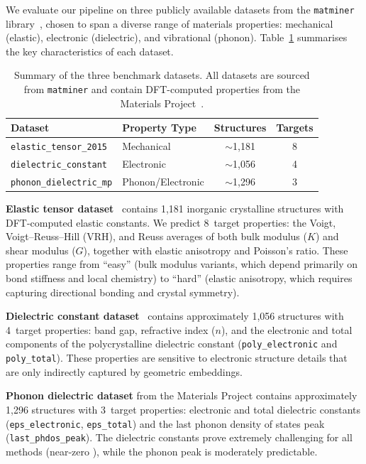 We evaluate our pipeline on three publicly available datasets from the \texttt{matminer} library~\cite{ward2018matminer}, chosen to span a diverse range of materials properties: mechanical (elastic), electronic (dielectric), and vibrational (phonon).
Table~\ref{tab:datasets} summarises the key characteristics of each dataset.

\begin{table}[H]
    \centering
    \caption{Summary of the three benchmark datasets. All datasets are sourced from \texttt{matminer} and contain DFT-computed properties from the Materials Project~\cite{jain2013materials}.}
    \label{tab:datasets}
    \small
    \begin{tabular}{@{}llcc@{}}
        \toprule
        \textbf{Dataset} & \textbf{Property Type} & \textbf{Structures} & \textbf{Targets} \\
        \midrule
        \texttt{elastic\_tensor\_2015} & Mechanical & $\sim$1{,}181 & 8 \\
        \texttt{dielectric\_constant} & Electronic & $\sim$1{,}056 & 4 \\
        \texttt{phonon\_dielectric\_mp} & Phonon/Electronic & $\sim$1{,}296 & 3 \\
        \bottomrule
    \end{tabular}
\end{table}

\textbf{Elastic tensor dataset}~\cite{deJong2015elastic} contains 1{,}181 inorganic crystalline structures with DFT-computed elastic constants.
We predict 8~target properties: the Voigt, Voigt--Reuss--Hill (VRH), and Reuss averages of both bulk modulus ($K$) and shear modulus ($G$), together with elastic anisotropy and Poisson's ratio.
These properties range from ``easy'' (bulk modulus variants, which depend primarily on bond stiffness and local chemistry) to ``hard'' (elastic anisotropy, which requires capturing directional bonding and crystal symmetry).

\textbf{Dielectric constant dataset}~\cite{petousis2017high} contains approximately 1{,}056 structures with 4~target properties: band gap, refractive index ($n$), and the electronic and total components of the polycrystalline dielectric constant (\texttt{poly\_electronic} and \texttt{poly\_total}).
These properties are sensitive to electronic structure details that are only indirectly captured by geometric embeddings.

\textbf{Phonon dielectric dataset} from the Materials Project contains approximately 1{,}296 structures with 3~target properties: electronic and total dielectric constants (\texttt{eps\_electronic}, \texttt{eps\_total}) and the last phonon density of states peak (\texttt{last\_phdos\_peak}).
The dielectric constants prove extremely challenging for all methods (near-zero \Rtwo{}), while the phonon peak is moderately predictable.


